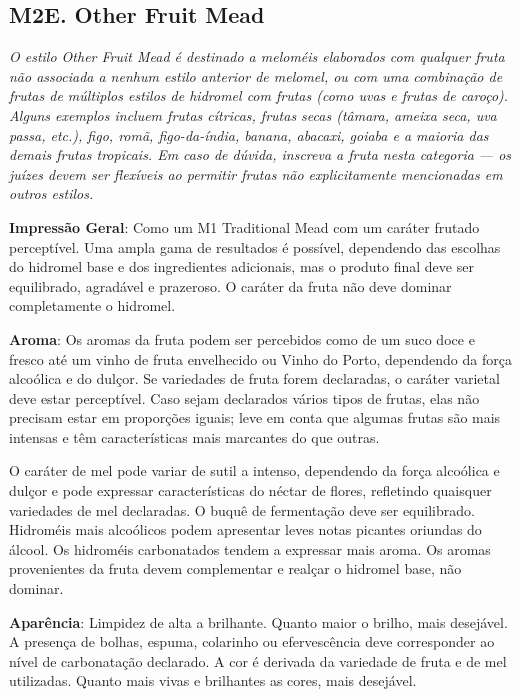 \subsection*{M2E. Other Fruit Mead}

\textit{O estilo Other Fruit Mead é destinado a meloméis elaborados com qualquer fruta não associada a nenhum estilo anterior de melomel, ou com uma combinação de frutas de múltiplos estilos de hidromel com frutas (como uvas e frutas de caroço). Alguns exemplos incluem frutas cítricas, frutas secas (tâmara, ameixa seca, uva passa, etc.), figo, romã, figo-da-índia, banana, abacaxi, goiaba e a maioria das demais frutas tropicais. Em caso de dúvida, inscreva a fruta nesta categoria — os juízes devem ser flexíveis ao permitir frutas não explicitamente mencionadas em outros estilos.}

\textbf{Impressão Geral}: Como um M1 Traditional Mead com um caráter frutado perceptível. Uma ampla gama de resultados é possível, dependendo das escolhas do hidromel base e dos ingredientes adicionais, mas o produto final deve ser equilibrado, agradável e prazeroso. O caráter da fruta não deve dominar completamente o hidromel.

\textbf{Aroma}: Os aromas da fruta podem ser percebidos como de um suco doce e fresco até um vinho de fruta envelhecido ou Vinho do Porto, dependendo da força alcoólica e do dulçor. Se variedades de fruta forem declaradas, o caráter varietal deve estar perceptível. Caso sejam declarados vários tipos de frutas, elas não precisam estar em proporções iguais; leve em conta que algumas frutas são mais intensas e têm características mais marcantes do que outras.

O caráter de mel pode variar de sutil a intenso, dependendo da força alcoólica e dulçor e pode expressar características do néctar de flores, refletindo quaisquer variedades de mel declaradas. O buquê de fermentação deve ser equilibrado. Hidroméis mais alcoólicos podem apresentar leves notas picantes oriundas do álcool. Os hidroméis carbonatados tendem a expressar mais aroma. Os aromas provenientes da fruta devem complementar e realçar o hidromel base, não dominar.

\textbf{Aparência}: Limpidez de alta a brilhante. Quanto maior o brilho, mais desejável. A presença de bolhas, espuma, colarinho ou efervescência deve corresponder ao nível de carbonatação declarado. A cor é derivada da variedade de fruta e de mel utilizadas. Quanto mais vivas e brilhantes as cores, mais desejável.


